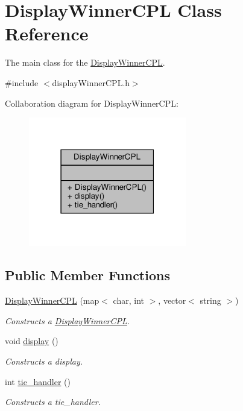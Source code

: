 \hypertarget{classDisplayWinnerCPL}{}\section{Display\+Winner\+C\+PL Class Reference}
\label{classDisplayWinnerCPL}


The main class for the \hyperlink{classDisplayWinnerCPL}{Display\+Winner\+C\+PL}.  




{\ttfamily \#include $<$display\+Winner\+C\+P\+L.\+h$>$}



Collaboration diagram for Display\+Winner\+C\+PL\+:\nopagebreak
\begin{figure}[H]
\begin{center}
\leavevmode
\includegraphics[width=195pt]{classDisplayWinnerCPL__coll__graph}
\end{center}
\end{figure}
\subsection*{Public Member Functions}
\begin{DoxyCompactItemize}
\item 
\hyperlink{classDisplayWinnerCPL_a5a3822a5efe5b15910efc9947cdaabd0}{Display\+Winner\+C\+PL} (map$<$ char, int $>$, vector$<$ string $>$)
\begin{DoxyCompactList}\small\item\em Constructs a \hyperlink{classDisplayWinnerCPL}{Display\+Winner\+C\+PL}. \end{DoxyCompactList}\item 
void \hyperlink{classDisplayWinnerCPL_a7ec6d5d90169f136e66290f3b77045e1}{display} ()
\begin{DoxyCompactList}\small\item\em Constructs a display. \end{DoxyCompactList}\item 
int \hyperlink{classDisplayWinnerCPL_a967c2bc90c53caf7788726e74d31d7ba}{tie\+\_\+handler} ()
\begin{DoxyCompactList}\small\item\em Constructs a tie\+\_\+handler. \end{DoxyCompactList}\end{DoxyCompactItemize}


